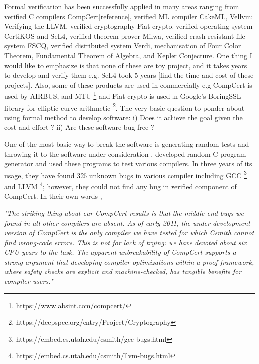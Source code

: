 	Formal verification has been successfully applied in many areas ranging 
	from verified C compilers CompCert[reference], verified ML compiler
	CakeML, Vellvm: Verifying the LLVM, verified cryptography 
	Fiat-crypto, verified 
	operating system CertiKOS and SeL4, verified theorem prover Milwa, 
	verified crash resistant file system FSCQ, verified distributed system 
	Verdi, mechanisation of Four Color Theorem, Fundamental Theorem of 
	Algebra, and Kepler Conjecture. One thing I would like to emphasize 
	is that none of these are toy project, and it takes years 
	to develop and verify them e.g. SeL4 took 5 years [find the time and 
	cost of these projects]. Also, some of these products 
	are used in commercially e.g CompCert is used by AIRBUS, and MTU
	\footnote{https://www.absint.com/compcert/} and Fiat-crypto is used 
	in Google's BoringSSL library for elliptic-curve arithmetic 
	\footnote{https://deepspec.org/entry/Project/Cryptography}. 
	The very basic question to ponder about using formal method to develop 
	software:  i) Does it achieve the goal given the cost and effort ? ii) Are these 
	software bug free ?
   
	One of the most basic way to 
	break the software is generating random tests and throwing it to 
	the software under consideration \cite{Miller:1990:ESR:96267.96279}.
	\cite{Yang:2011:FUB:1993316.1993532} developed random 
	C program generator and used these programs to test various 
	compilers. In three years of its usage, they have found 325 unknown
	bugs in various compiler including GCC
	\footnote{https://embed.cs.utah.edu/csmith/gcc-bugs.html} and LLVM
	\footnote{https://embed.cs.utah.edu/csmith/llvm-bugs.html}; however, 
	they could not find any bug in verified component of CompCert. 
	In their own words \cite{Yang:2011:FUB:1993316.1993532},
	
	\textit{"The striking thing about our CompCert results is that the middle-end 
	bugs we found in all other compilers are absent. As of early 2011,
	the under-development version of CompCert is the only compiler we
	have tested for which Csmith cannot find wrong-code errors. This is
	not for lack of trying: we have devoted about six CPU-years to the
	task. The apparent unbreakability of CompCert supports a strong
	argument that developing compiler optimizations within a proof
	framework, where safety checks are explicit and machine-checked,
	has tangible benefits for compiler users."}
	
